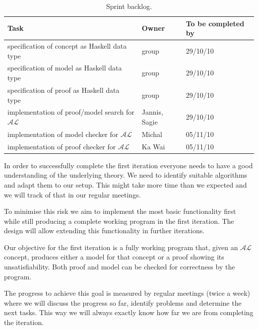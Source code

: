 
\begin{table}
  \caption{Sprint backlog.}
  \begin{tabular}{l|l|l}
    \hline
    \textbf{Task} & \textbf{Owner} & \textbf{To be completed by} \\
    \hline
    specification of concept as Haskell data type & group & 29/10/10 \\
    specification of model as Haskell data type & group & 29/10/10 \\
    specification of proof as Haskell data type & group & 29/10/10 \\
    implementation of proof/model search for $\mathcal{AL}$ & Jannis, Sagie & 29/10/10 \\
    implementation of model checker for $\mathcal{AL}$ & Michal & 05/11/10 \\
    implementation of proof checker for $\mathcal{AL}$ & Ka Wai & 05/11/10
  \end{tabular}
  \label{sprint}
\end{table}


In order to successfully complete the first iteration everyone needs to have a good
understanding of the underlying theory. We need to identify suitable algorithms and
adapt them to our setup. This might take more time than we expected and we will 
track of that in our regular meetings.

To minimise this risk we aim to implement the most basic functionality first while
still producing a complete working program in the first iteration. The design will
allow extending this functionality in further iterations.


Our objective for the first iteration is a fully working program that, given an
$\mathcal{AL}$ concept, produces either a model for that concept or a proof showing its
unsatisfiability. Both proof and model can be checked for correctness by the program.

The progress to achieve this goal is measured by regular meetings (twice a week) where
we will discuss the progress so far, identify problems and determine the next tasks. This
way we will always exactly know how far we are from completing the iteration.
